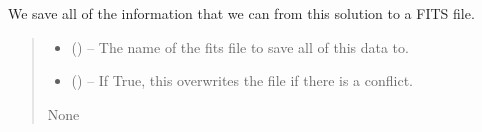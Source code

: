 \documentclass[letterpaper,11pt,english]{sphinxmanual}
\begin{document}
\begin{savenotes}
\begin{fulllineitems}
\begin{savenotes}\begin{fulllineitems}
\label{\detokenize{code/opihiexarata.opihi.solution:opihiexarata.opihi.solution.OpihiSolution.save_to_fits_file}}
\pysigstartsignatures
{}
\pysigstopsignatures
\sphinxAtStartPar
We save all of the information that we can from this solution to
a FITS file.
\begin{quote}\begin{description}
\begin{itemize}
\item {} 
\sphinxAtStartPar
{} () – The name of the fits file to save all of this data to.

\item {} 
\sphinxAtStartPar
{} (\sphinxstyleliteralemphasis{\sphinxupquote{, }}) – If True, this overwrites the file if there is a conflict.

\end{itemize}

\sphinxAtStartPar
None

\end{description}\end{quote}

\end{fulllineitems}\end{savenotes}



\end{fulllineitems}
\end{savenotes}
\end{document}

